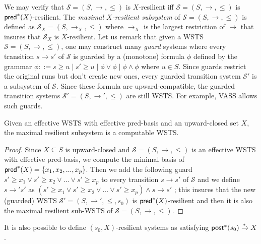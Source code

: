 We may verify that  $\mathscr{S}=(S, \rightarrow, \leq)$ is $X$-resilient iff  $\mathscr{S}=(S, \rightarrow, \leq)$ is $\textsf{pred}^*(X)$-resilient. The \emph{maximal $X$-resilient subsystem} of $\mathscr{S}=(S,\rightarrow,\leq)$ is defined as $\mathscr{S}_X=(S,\rightarrow_X,\leq)$ where $\rightarrow_X$ is the largest restriction of $\rightarrow$ that insures that $\mathscr{S}_X$ is $X$-resilient.
Let us remark that given a WSTS $\mathscr{S}=(S, \rightarrow, \leq)$, one may construct many \emph{guard} systems where every transition $s \rightarrow s'$ of $\mathscr{S}$ is guarded by a (monotone) formula $\phi$ defined by the grammar $\phi ::= s \geq u \mid s' \geq u \mid \phi \vee \phi \mid \phi \wedge \phi$ where $u \in S$. Since guards restrict the original runs but don't create new ones, every guarded transition system $\mathscr{S'}$ is a subsystem of $\mathscr{S}$. Since these formula are upward-compatible, the guarded transition systems $\mathscr{S'}=(S, \rightarrow', \leq)$ are still WSTS.
%
For example, VASS allows such guards.

\begin{theorem}{}
Given an effective WSTS with effective pred-basis and an upward-closed set $X$, the maximal resilient subsystem is a computable WSTS.
\end{theorem}

\begin{proof}
Since $X \subseteq S$ is upward-closed and $\mathscr{S}=(S, \rightarrow, \leq)$ is an effective WSTS with effective pred-basis, we compute the minimal basis of $\textsf{pred}^*(X)=\{x_1,x_2,...,x_p\}$. 
%
%
Then we add the following guard $s' \geq x_1  	\vee s' \geq x_2  	\vee...	\vee s' \geq x_p$ to every transition $s \rightarrow s'$ of $\mathscr{S}$ and we define  $s \rightarrow' s'$ as $(s' \geq x_1  	\vee s' \geq x_2  	\vee...	\vee s' \geq x_p) \wedge s \rightarrow s'$ ; this insures that the new (guarded) WSTS $\mathscr{S'}=(S, \rightarrow', \leq,s_0)$ is $\textsf{pred}^*(X)$-resilient and then it is also the maximal resilient sub-WSTS of $\mathscr{S}=(S, \rightarrow, \leq)$.
		\end{proof}
%
It is also possible to define $(s_0,X)$-resilient systems as satisfying $\textsf{post}^*(s_0) \xrightarrow{*} X$.



